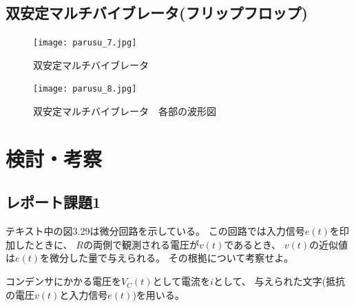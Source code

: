 \documentclass[12pt]{jarticle}
\begin{document}
\subsection{双安定マルチバイブレータ(フリップフロップ)}

\clearpage
\begin{figure}[h]
    \begin{center}
        \texttt{[image: parusu\_7.jpg]}
    \end{center}
    \caption{双安定マルチバイブレータ}
    \label{fig7}
    \begin{center}
        \texttt{[image: parusu\_8.jpg]}
    \end{center}
    \caption{双安定マルチバイブレータ　各部の波形図}
    \label{fig8}
\end{figure}
\clearpage

\section{検討・考察}

\subsection{レポート課題1}
\begin{shadebox}
    テキスト中の図3.29は微分回路を示している。
    この回路では入力信号$e(t)$を印加したときに、
    $R$の両側で観測される電圧が$v(t)$であるとき、
    $v(t)$の近似値は$e(t)$を微分した量で与えられる。
    その根拠について考察せよ。
\end{shadebox}
コンデンサにかかる電圧を$V_C(t)$として電流を$i$として、
与えられた文字(抵抗の電圧$v(t)$と入力信号$e(t)$)を用いる。
\end{document}
